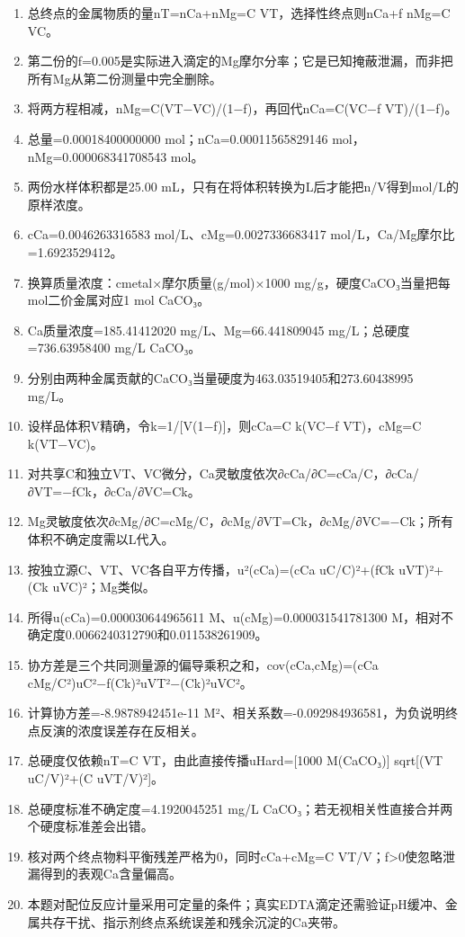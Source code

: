 \documentclass[UTF8,11pt,a4paper]{ctexart}
\begin{document}
\begin{enumerate}
\item 总终点的金属物质的量nT=nCa+nMg=C VT，选择性终点则nCa+f nMg=C VC。
\item 第二份的f=0.005是实际进入滴定的Mg摩尔分率；它是已知掩蔽泄漏，而非把所有Mg从第二份测量中完全删除。
\item 将两方程相减，nMg=C(VT−VC)/(1−f)，再回代nCa=C(VC−f VT)/(1−f)。
\item 总量=0.00018400000000 mol；nCa=0.00011565829146 mol，nMg=0.000068341708543 mol。
\item 两份水样体积都是25.00 mL，只有在将体积转换为L后才能把n/V得到mol/L的原样浓度。
\item cCa=0.0046263316583 mol/L、cMg=0.0027336683417 mol/L，Ca/Mg摩尔比=1.6923529412。
\item 换算质量浓度：cmetal×摩尔质量(g/mol)×1000 mg/g，硬度CaCO₃当量把每mol二价金属对应1 mol CaCO₃。
\item Ca质量浓度=185.41412020 mg/L、Mg=66.441809045 mg/L；总硬度=736.63958400 mg/L CaCO₃。
\item 分别由两种金属贡献的CaCO₃当量硬度为463.03519405和273.60438995 mg/L。
\item 设样品体积V精确，令k=1/[V(1−f)]，则cCa=C k(VC−f VT)，cMg=C k(VT−VC)。
\item 对共享C和独立VT、VC微分，Ca灵敏度依次∂cCa/∂C=cCa/C，∂cCa/∂VT=−fCk，∂cCa/∂VC=Ck。
\item Mg灵敏度依次∂cMg/∂C=cMg/C，∂cMg/∂VT=Ck，∂cMg/∂VC=−Ck；所有体积不确定度需以L代入。
\item 按独立源C、VT、VC各自平方传播，u²(cCa)=(cCa uC/C)²+(fCk uVT)²+(Ck uVC)²；Mg类似。
\item 所得u(cCa)=0.000030644965611 M、u(cMg)=0.000031541781300 M，相对不确定度0.0066240312790和0.011538261909。
\item 协方差是三个共同测量源的偏导乘积之和，cov(cCa,cMg)=(cCa cMg/C²)uC²−f(Ck)²uVT²−(Ck)²uVC²。
\item 计算协方差=-8.9878942451e-11 M²、相关系数=-0.092984936581，为负说明终点反演的浓度误差存在反相关。
\item 总硬度仅依赖nT=C VT，由此直接传播uHard=[1000 M(CaCO₃)] sqrt[(VT uC/V)²+(C uVT/V)²]。
\item 总硬度标准不确定度=4.1920045251 mg/L CaCO₃；若无视相关性直接合并两个硬度标准差会出错。
\item 核对两个终点物料平衡残差严格为0，同时cCa+cMg=C VT/V；f>0使忽略泄漏得到的表观Ca含量偏高。
\item 本题对配位反应计量采用可定量的条件；真实EDTA滴定还需验证pH缓冲、金属共存干扰、指示剂终点系统误差和残余沉淀的Ca夹带。
\end{enumerate}
\end{document}
